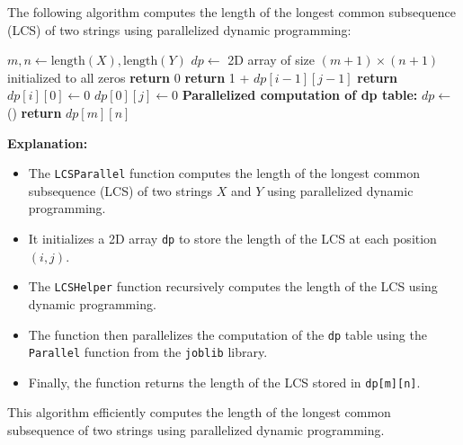 \documentclass[12pt]{book} %
\begin{document}
The following algorithm computes the length of the longest common subsequence (LCS) of two strings using parallelized dynamic programming:
\FloatBarrier
\begin{algorithm}
\caption{Parallelized LCS Algorithm}\label{parallel-lcs}
\begin{algorithmic}[1]
    \State $m, n \gets \text{length}(X), \text{length}(Y)$
    \State $dp \gets$ 2D array of size $(m+1) \times (n+1)$ initialized to all zeros
            \State \textbf{return} 0
            \State \textbf{return} 1 + $dp[i - 1][j - 1]$
        \Else
            \State \textbf{return} 
        \EndIf
    \EndFunction
        \State $dp[i][0] \gets 0$
    \EndFor
        \State $dp[0][j] \gets 0$
    \EndFor
    \State \textbf{Parallelized computation of dp table:}
    \State $dp \gets$ ()
    \State \textbf{return} $dp[m][n]$
\EndFunction
\end{algorithmic}
\end{algorithm}
\FloatBarrier
\textbf{Explanation:}
\begin{itemize}
    \item The \texttt{LCSParallel} function computes the length of the longest common subsequence (LCS) of two strings $X$ and $Y$ using parallelized dynamic programming.
    \item It initializes a 2D array \texttt{dp} to store the length of the LCS at each position $(i, j)$.
    \item The \texttt{LCSHelper} function recursively computes the length of the LCS using dynamic programming.
    \item The function then parallelizes the computation of the \texttt{dp} table using the \texttt{Parallel} function from the \texttt{joblib} library.
    \item Finally, the function returns the length of the LCS stored in \texttt{dp[m][n]}.
\end{itemize}

This algorithm efficiently computes the length of the longest common subsequence of two strings using parallelized dynamic programming.
\end{document}
